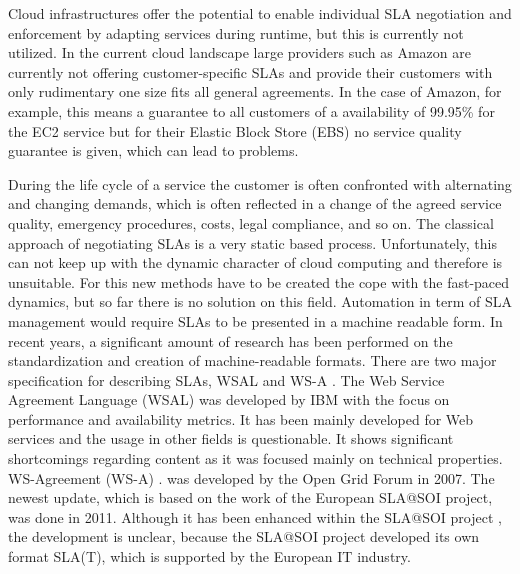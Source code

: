 Cloud infrastructures offer the potential to enable individual SLA negotiation and enforcement by adapting services during runtime, but this is currently not utilized. In the current cloud landscape large providers such as Amazon are currently not offering customer-specific SLAs and provide their customers with only rudimentary one size fits all general agreements. In the case of Amazon, for example, this means a guarantee to all customers of a availability of 99.95\% for the EC2 service but for their Elastic Block Store (EBS) no service quality guarantee is given, which can lead to problems. 

During the life cycle of a service the customer is often confronted with alternating and changing demands, which is often reflected in a change of the agreed service quality, emergency procedures, costs, legal compliance, and so on. The classical approach of negotiating SLAs is a very static based process. Unfortunately, this can not keep up with the dynamic character of cloud computing and therefore is unsuitable. For this new methods have to be created the cope with the fast-paced dynamics, but so far there is no solution on this field. Automation in term  of SLA management would require SLAs to be presented in a machine readable form. In recent years, a significant amount of research has been performed on the standardization and creation of machine-readable formats. There are two major specification for describing SLAs, WSAL  \cite{Ludwig03WSLA} and WS-A  \cite{Kearney2011b}.  The Web Service Agreement Language (WSAL)  \cite{Ludwig03WSLA} was developed by IBM with the focus on performance and availability metrics. It has been mainly developed for Web services and the usage in other fields is questionable. It shows significant shortcomings regarding content as it was focused mainly on technical properties. WS-Agreement (WS-A)  \cite{Kearney2011b}.  was developed by the Open Grid Forum in 2007. The newest update, which is based on the work of the European SLA@SOI project, was done in 2011. Although it has been enhanced within the SLA@SOI project  \cite{slasoi2011}, the development is unclear, because the SLA@SOI project developed its own format SLA(T), which is supported by the European IT industry.

